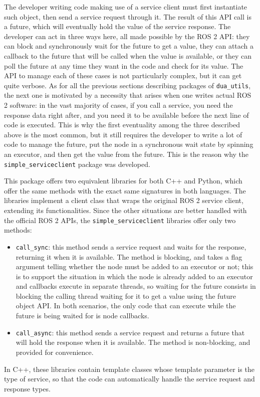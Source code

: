 The developer writing code making use of a service client must first instantiate such object, then send a service request through it. The result of this API call is a future, which will eventually hold the value of the service response. The developer can act in three ways here, all made possible by the ROS 2 API: they can block and synchronously wait for the future to get a value, they can attach a callback to the future that will be called when the value is available, or they can poll the future at any time they want in the code and check for its value. The API to manage each of these cases is not particularly complex, but it can get quite verbose. As for all the previous sections describing packages of \texttt{dua\_utils}, the next one is motivated by a necessity that arises when one writes actual ROS 2 software: in the vast majority of cases, if you call a service, you need the response data right after, and you need it to be available before the next line of code is executed. This is why the first eventuality among the three described above is the most common, but it still requires the developer to write a lot of code to manage the future, put the node in a synchronous wait state by spinning an executor, and then get the value from the future. This is the reason why the \texttt{simple\_serviceclient} package \cite{masocco_simple_serviceclient_nodate} was developed.

This package offers two equivalent libraries for both C++ and Python, which offer the same methods with the exact same signatures in both languages. The libraries implement a client class that wraps the original ROS 2 service client, extending its functionalities. Since the other situations are better handled with the official ROS 2 APIs, the \texttt{simple\_serviceclient} libraries offer only two methods:
\begin{itemize}
  \item \texttt{call\_sync}: this method sends a service request and waits for the response, returning it when it is available. The method is blocking, and takes a flag argument telling whether the node must be added to an executor or not; this is to support the situation in which the node is already added to an executor and callbacks execute in separate threads, so waiting for the future consists in blocking the calling thread waiting for it to get a value using the future object API. In both scenarios, the only code that can execute while the future is being waited for is node callbacks.
  \item \texttt{call\_async}: this method sends a service request and returns a future that will hold the response when it is available. The method is non-blocking, and provided for convenience.
\end{itemize}
In C++, these libraries contain template classes whose template parameter is the type of service, so that the code can automatically handle the service request and response types.

